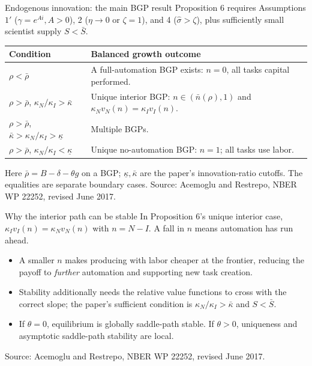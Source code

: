 \documentclass[aspectratio=169,11pt]{beamer}
\newcommand{\sourcefoot}{\vfill{\color{muted}\scriptsize Source: Acemoglu and Restrepo, NBER WP 22252, revised June 2017.}}
\begin{document}
\begin{frame}{Endogenous innovation: the main BGP result}
\small Proposition 6 requires Assumptions $1'$ ($\gamma=e^{Ai}, A>0$), 2 ($\eta\to0$ or $\zeta=1$), and 4 ($\widehat\sigma>\zeta$), plus sufficiently small scientist supply $S<\bar S$.
\vspace{0.35em}
\begin{center}
\begin{tabular}{p{4.2cm}p{7.1cm}}
\toprule
Condition & Balanced growth outcome \\
\midrule
$\rho<\bar\rho$ & A full-automation BGP exists: $n=0$, all tasks capital performed. \\
$\rho>\bar\rho$, $\kappa_N/\kappa_I>\bar\kappa$ & Unique interior BGP: $n\in(\bar n(\rho),1)$ and $\kappa_N v_N(n)=\kappa_I v_I(n)$. \\
$\rho>\bar\rho$, $\bar\kappa>\kappa_N/\kappa_I>\underline\kappa$ & Multiple BGPs. \\
$\rho>\bar\rho$, $\kappa_N/\kappa_I<\underline\kappa$ & Unique no-automation BGP: $n=1$; all tasks use labor. \\
\bottomrule
\end{tabular}
\end{center}
\scriptsize Here $\bar\rho=B-\delta-\theta g$ on a BGP; $\underline\kappa,\bar\kappa$ are the paper's innovation-ratio cutoffs. The equalities are separate boundary cases.
\sourcefoot
\end{frame}

\begin{frame}{Why the interior path can be stable}
\small In Proposition 6's unique interior case, $\kappa_I v_I(n)=\kappa_N v_N(n)$ with $n=N-I$. A fall in $n$ means automation has run ahead.
\vspace{0.7em}
\begin{itemize}\setlength\itemsep{0.65em}
\item A smaller $n$ makes producing with labor cheaper at the frontier, reducing the payoff to \emph{further} automation and supporting new task creation.
\item Stability additionally needs the relative value functions to cross with the correct slope; the paper's sufficient condition is $\kappa_N/\kappa_I>\bar\kappa$ and $S<\bar S$.
\item If $\theta=0$, equilibrium is globally saddle-path stable. If $\theta>0$, uniqueness and asymptotic saddle-path stability are local.
\end{itemize}
\sourcefoot
\end{frame}
\end{document}
